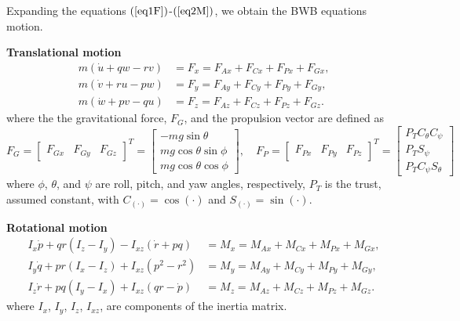 \documentclass[10pt]{article}
\begin{document}
Expanding the equations $(\ref{eq1F})$-$(\ref{eq2M})$, we obtain the BWB equations motion. 

\textbf{Translational motion}
\begin{align}
    m(\dot{u}+qw-rv) &= F_x = F_{Ax}+F_{Cx}+F_{Px}+F_{Gx},\\
    m(\dot{v}+ru-pw) &= F_y = F_{Ay}+F_{Cy}+F_{Py}+F_{Gy},\\
    m(\dot{w}+pv-qu) &= F_z = F_{Az}+F_{Cz}+F_{Pz}+F_{Gz}.
\end{align}
where the the gravitational force, $F_G$, and the propulsion vector are defined as
\begin{equation}
    F_G =
    \begin{bmatrix}
        F_{Gx} & F_{Gy} & F_{Gz}
    \end{bmatrix}^{T}
    =
    \begin{bmatrix}
        -mg\sin\theta\\
        mg\cos\theta\sin\phi\\
        mg\cos\theta\cos\phi
    \end{bmatrix},\quad
    F_P =
    \begin{bmatrix}
        F_{Px} & F_{Py} & F_{Pz}
    \end{bmatrix}^{T}
    =
    \begin{bmatrix}
        P_T C_{\theta}C_{\psi}\\
        P_T S_{\psi}\\
        P_T C_{\psi}S_{\theta}
    \end{bmatrix}
\end{equation}
where $\phi$, $\theta$, and $\psi$ are roll, pitch, and yaw angles, respectively, $P_T$ is the trust, assumed constant, with  $C_{(\cdot)}=\cos(\cdot)$ and
$S_{(\cdot)}=\sin(\cdot)$.

\textbf{Rotational motion}
\begin{align}
    I_x\dot{p} + qr(I_z-I_y) - I_{xz}(\dot{r}+pq)
    &= M_x = M_{Ax}+M_{Cx}+M_{Px}+M_{Gx},\\
    I_y\dot{q} + pr(I_x-I_z) + I_{xz}(p^2-r^2)
    &= M_y = M_{Ay}+M_{Cy}+M_{Py}+M_{Gy},\\
    I_z\dot{r} + pq(I_y-I_x) + I_{xz}(qr-\dot{p})
    &= M_z = M_{Az}+M_{Cz}+M_{Pz}+M_{Gz}.
\end{align}
where $I_x$, $I_y$, $I_z$, $I_{xz}$, are components of the inertia matrix.
\end{document}
